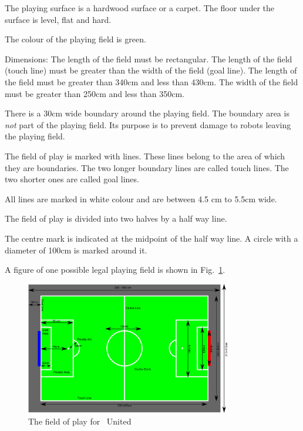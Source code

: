 \documentclass[12pt]{hurocup}
\begin{document}
\begin{lawlist}[US]
  
\item The playing surface is a hardwood surface or a carpet. The floor
  under the surface is level, flat and hard.

\item The colour of the playing field is green.
  
\item Dimensions: The length of the field must be rectangular. The
  length of the field (touch line) must be greater than the width of
  the field (goal line). The length of the field must be greater than
  340cm and less than 430cm. The width of the field must be greater
  than 250cm and less than 350cm.
 
\item There is a 30cm wide boundary around the playing field. The
  boundary area is \emph{not} part of the playing field. Its purpose
  is to prevent damage to robots leaving the playing field.
 
\item The field of play is marked with lines. These lines belong to
  the area of which they are boundaries. The two longer boundary lines
  are called touch lines. The two shorter ones are called goal lines.

\item All lines are marked in white colour and are between 4.5 cm to
  5.5cm wide.

\item The field of play is divided into two halves by a half way
  line. 

\item The centre mark is indicated at the midpoint of the half way
  line. A circle with a diameter of 100cm is marked around it.
  
\item A figure of one possible legal playing field is shown in
  Fig.~\ref{fig:field-hurocup}.
  
  \begin{figure}
    \begin{center}
      \includegraphics[width=0.8\textwidth]{Figures/hurocup-field}
      \caption{The field of play for \HuroCup\ United}
      \label{fig:field-hurocup}
    \end{center}
  \end{figure}
  

\end{lawlist}
\end{document}

